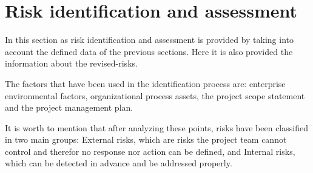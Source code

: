 

\section{Risk identification and assessment}

In this section as risk identification and assessment is provided by taking into account the defined data of the previous sections. Here it is also provided the information about the revised-risks. 

The factors that have been used in the identification process are: enterprise environmental factors, organizational process assets, the project scope statement and the project management plan.

It is worth to mention that after analyzing these points, risks have been classified in two main groups: External risks, which are risks the project team cannot control and therefor no response nor action can be defined, and Internal risks, which can be detected in advance and be addressed properly.

